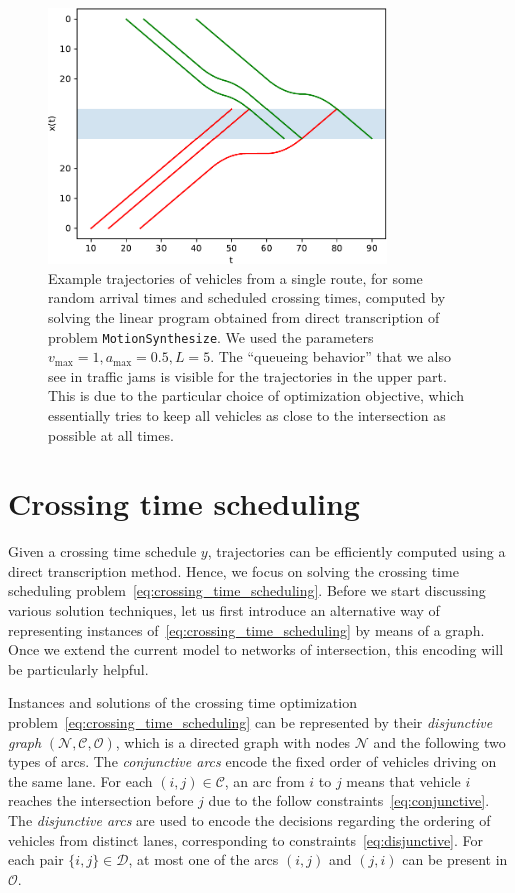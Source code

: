 \documentclass[a4paper]{article}
\theoremstyle{definition}
\theoremstyle{plain}
\begin{document}
\begin{figure}
  \centering
  \includegraphics[width=0.8\textwidth]{figures/single/trajectories_delay.pdf}
  \caption{Example trajectories of vehicles from a single route, for some random
    arrival times and scheduled crossing times, computed by solving the linear
    program obtained from direct transcription of problem \texttt{MotionSynthesize}. We
    used the parameters $v_{\max} = 1, a_{\max} = 0.5, L = 5$. The ``queueing
    behavior'' that we also see in traffic jams is visible for the trajectories
    in the upper part. This is due to the particular choice of optimization
    objective, which essentially tries to keep all vehicles as close to the
    intersection as possible at all times.}
\end{figure}


\section{Crossing time scheduling}

Given a crossing time schedule $y$, trajectories can be efficiently computed
using a direct transcription method. Hence, we focus on solving the crossing
time scheduling problem~\eqref{eq:crossing_time_scheduling}. Before we start
discussing various solution techniques, let us first introduce an alternative
way of representing instances of~\eqref{eq:crossing_time_scheduling} by means of a
graph. Once we extend the current model to networks of intersection, this
encoding will be particularly helpful.

Instances and solutions of the crossing time optimization
problem~\eqref{eq:crossing_time_scheduling} can be represented by
their \textit{disjunctive graph}
$(\mathcal{N}, \mathcal{C}, \mathcal{O})$, which is a directed graph with nodes
$\mathcal{N}$ and the following two types of arcs. The \textit{conjunctive arcs}
encode the fixed order of vehicles driving on the same lane. For each
$(i,j) \in \mathcal{C}$, an arc from $i$ to $j$ means that vehicle $i$ reaches
the intersection before $j$ due to the follow
constraints~\eqref{eq:conjunctive}. The \textit{disjunctive arcs} are used to
encode the decisions regarding the ordering of vehicles from distinct lanes,
corresponding to constraints~\eqref{eq:disjunctive}. For each pair
$\{i,j\} \in \mathcal{D}$, at most one of the arcs $(i,j)$ and $(j,i)$ can be
present in $\mathcal{O}$.
\end{document}
